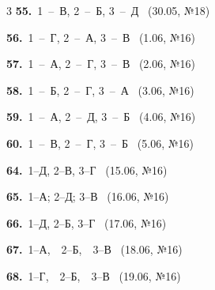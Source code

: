 \documentclass[12pt]{article}
\begin{document}
\ifshowsolutions
{}
\begin{multicols}{3}\noindent
\noindent\textbf{55.}~1~--~В, 2~--~Б, 3~--~Д \ {\scriptsize\color{gray}(30.05, №18)}\par
\noindent\textbf{56.}~1~--~Г, 2~--~А, 3~--~В \ {\scriptsize\color{gray}(1.06, №16)}\par
\noindent\textbf{57.}~1~--~А, 2~--~Г, 3~--~В \ {\scriptsize\color{gray}(2.06, №16)}\par
\noindent\textbf{58.}~1~--~Б, 2~--~Г, 3~--~А \ {\scriptsize\color{gray}(3.06, №16)}\par
\noindent\textbf{59.}~1~--~А, 2~--~Д, 3~--~Б \ {\scriptsize\color{gray}(4.06, №16)}\par
\noindent\textbf{60.}~1~--~В, 2~--~Г, 3~--~Б \ {\scriptsize\color{gray}(5.06, №16)}\par
\noindent\textbf{64.}~1--Д, 2--В, 3--Г \ {\scriptsize\color{gray}(15.06, №16)}\par
\noindent\textbf{65.}~1--А; 2--Д; 3--В \ {\scriptsize\color{gray}(16.06, №16)}\par
\noindent\textbf{66.}~1--Д, 2--Б, 3--Г \ {\scriptsize\color{gray}(17.06, №16)}\par
\noindent\textbf{67.}~1--А,\ \ 2--Б,\ \ 3--В \ {\scriptsize\color{gray}(18.06, №16)}\par
\noindent\textbf{68.}~1--Г,\ \ 2--Б,\ \ 3--В \ {\scriptsize\color{gray}(19.06, №16)}\par
\end{multicols}
\fi

\endgroup
\end{document}
